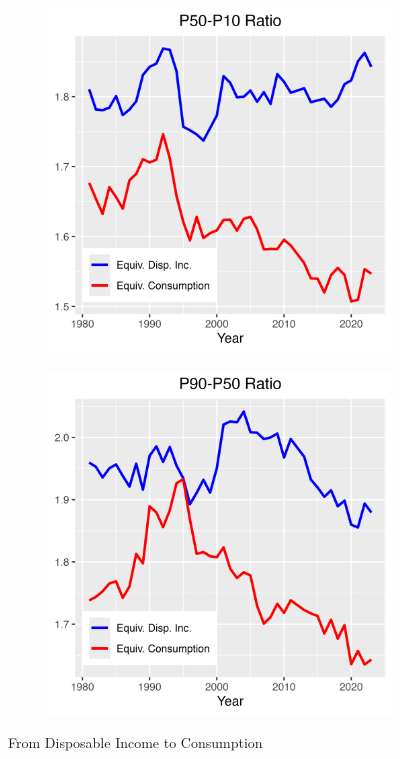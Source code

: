 \documentclass{article}
\begin{document}
\begin{figure}
\begin{subfigure}[t]{0.475\textwidth}
        \label{fig:Consumption_Gini}
    \end{subfigure}
    \begin{subfigure}[t]{0.475\textwidth}
        \centering
        \includegraphics[width=\textwidth]{figures/Fig_6/Fig_6c.png}
        \label{fig:Consumption_P50_P10}
    \end{subfigure}
    \begin{subfigure}[t]{0.475\textwidth}
        \centering
        \includegraphics[width=\textwidth]{figures/Fig_6/Fig_6d.png}
        \label{fig:Consumption_P90_P50}
    \end{subfigure}
    \caption{From Disposable Income to Consumption}
    \label{fig:Consumption}
\end{figure}
\end{document}
